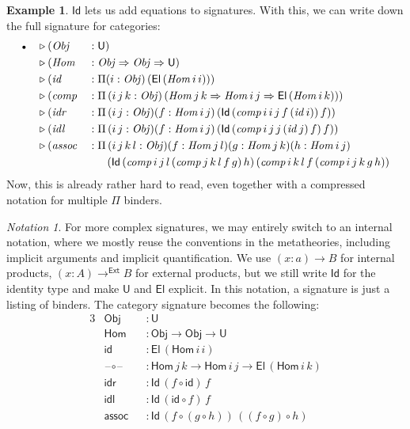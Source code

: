 \documentclass[12pt,a4paper,twoside,openany]{book}
\theoremstyle{remark}
\newtheorem{notation}{Notation}
\theoremstyle{definition}
\newtheorem{myexample}{Example}
\theoremstyle{theorem}
\newcommand{\mi}[1]{\mathit{#1}}
\newcommand{\ms}[1]{\mathsf{#1}}
\newcommand{\U}{\mathsf{U}}
\newcommand{\El}{\mathsf{El}}
\newcommand{\Id}{\mathsf{Id}}
\newcommand{\blank}{\mathord{\hspace{1pt}\text{--}\hspace{1pt}}}
\newcommand{\ext}{\triangleright}
\newcommand{\emptycon}{\scaleobj{.75}\bullet}
\newcommand{\funi}{\Rightarrow}
\newcommand{\toe}{\to^{\ms{Ext}}}
\begin{document}
\begin{myexample} $\Id$ lets us add equations to signatures. With this, we can write down the full
signature for categories:
\begin{alignat*}{3}
  & \emptycon &&\ext (\mi{Obj}   &&: \U)\\
  &           &&\ext (\mi{Hom}   &&: \mi{Obj} \funi \mi{Obj} \funi \U)\\
  &           &&\ext (\mi{id}    &&: \Pi(i : \mi{Obj})\,(\El\,(\mi{Hom}\,i\,i)))\\
  &           &&\ext (\mi{comp}  &&: \Pi\,(i\,j\,k : \mi{Obj})\,(\mi{Hom}\,j\,k \funi \mi{Hom}\,i\,j \funi \El\,(\mi{Hom}\,i\,k)))\\
  &           &&\ext (\mi{idr}   &&: \Pi\,(i\,j : \mi{Obj})(f : \mi{Hom}\,i\,j)\,(\Id\,(\mi{comp}\,i\,i\,j\,f\,(\mi{id}\,i))\,f))\\
  &           &&\ext (\mi{idl}   &&: \Pi\,(i\,j : \mi{Obj})(f : \mi{Hom}\,i\,j)\,(\Id\,(\mi{comp}\,i\,j\,j\,(\mi{id}\,j)\,f)\,f))\\
  &           &&\ext (\mi{assoc} &&: \Pi\,(i\,j\,k\,l : \mi{Obj})(f : \mi{Hom}\,j\,l)(g : \mi{Hom}\,j\,k)(h : \mi{Hom}\,i\,j)\\
  &           && &&\hspace{1.7em} (\Id
                 \,(\mi{comp}\,i\,j\,l\,(\mi{comp}\,j\,k\,l\,f\,g)\,h)
                 \,(\mi{comp}\,i\,k\,l\,f\,(\mi{comp}\,i\,j\,k\,g\,h))
\end{alignat*}
Now, this is already rather hard to read, even together with a compressed
notation for multiple $\Pi$ binders.
\begin{notation}
For more complex signatures, we may entirely switch to an internal notation,
where we mostly reuse the conventions in the metatheories, including implicit
arguments and implicit quantification. We use $(x : a) \to B$ for internal
products, $(x : A) \toe B$ for external products, but we still write $\Id$ for
the identity type and make $\U$ and $\El$ explicit. In this notation, a
signature is just a listing of binders. The category signature becomes the
following:
\begin{alignat*}{3}
  & \ms{Obj} &&: \U\\
  & \ms{Hom} &&: \ms{Obj} \to \ms{Obj} \to \U\\
  & \ms{id}  &&: \El\,(\ms{Hom}\,i\,i)\\
  & \ms{\blank\!\circ\!\blank} &&: \ms{Hom}\,j\,k \to \ms{Hom}\,i\,j \to \El\,(\ms{Hom}\,i\,k)\\
  & \ms{idr} &&: \Id\,(f \circ \ms{id})\,f\\
  & \ms{idl} &&: \Id\,(\ms{id} \circ f)\,f\\
  & \ms{assoc} &&: \Id\,(f \circ (g \circ h))\,((f \circ g) \circ h)
\end{alignat*}
\end{notation}
\end{myexample}
\end{document}
